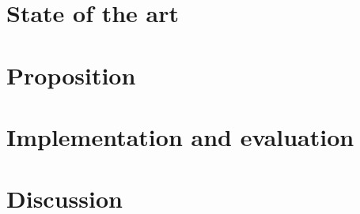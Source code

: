 \documentclass[runningheads]{llncs}
\begin{document}
\section{State of the art}
\label{sect:etat_art}


\section{Proposition}
\label{sect:proposition}


\section{Implementation and evaluation}
\label{sect:implementation}


\section{Discussion}
\label{sect:discussion}




\end{document}
